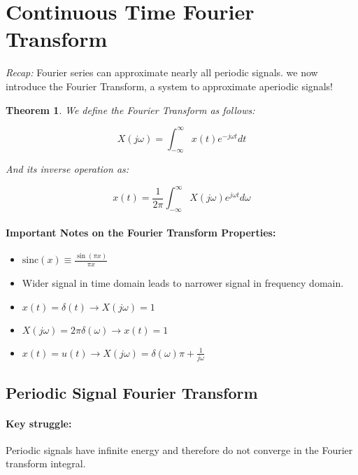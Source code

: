 \documentclass[a4paper,12pt]{report}
\newtheorem{theorem}{Theorem}
\begin{document}
\section{Continuous Time Fourier Transform}

\textit{Recap: } Fourier series can approximate nearly all periodic signals. we now introduce the Fourier Transform, a system to approximate aperiodic signals!

\begin{theorem}

We define the Fourier Transform as follows: 

\begin{equation}
X(j\omega) = \int_{-\infty}^{\infty} x(t) e^{-j\omega t} dt
\end{equation}

And its inverse operation as: 

\begin{equation}
x(t) = \frac{1}{2\pi} \int_{-\infty}^{\infty} X(j\omega) e^{j\omega t} d\omega
\end{equation}
\end{theorem}

\paragraph{Important Notes on the Fourier Transform Properties: } 

\begin{itemize}
\item $\text{sinc}(x) \equiv \frac{\sin(\pi x)}{\pi x}$
\item Wider signal in time domain leads to narrower signal in frequency domain.
\item $x(t) = \delta(t) \to X(j\omega) = 1$
\item $X(j\omega) = 2\pi \delta(\omega) \to x(t) = 1$
\item $x(t) = u(t) \to X(j\omega) = \delta(\omega) \pi + \frac{1}{j\omega}$
\end{itemize}

\subsection{Periodic Signal Fourier Transform}

\paragraph{Key struggle: } Periodic signals have infinite energy and therefore do not converge in the Fourier transform integral. 
\end{document}
